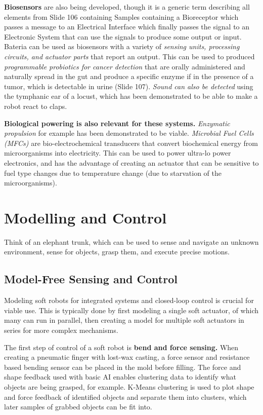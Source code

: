 \documentclass[onecolumn,a4paper]{article}
\begin{document}
\begin{itemize}
    \textbf{Biosensors} are also being developed, though it is a generic term describing all elements from Slide 106 containing Samples containing a Bioreceptor which passes a message to an Electrical Interface which finally passes the signal to an Electronic System that can use the signals to produce some output or input. Bateria can be used as biosensors with a variety of \emph{sensing units, processing circuits, and actuator parts} that report an output. This can be used to produced \emph{programmable probiotics for cancer detection} that are orally administered and naturally spread in the gut and produce a specific enzyme if in the presence of a tumor, which is detectable in urine (Slide 107). \emph{Sound can also be detected} using the tymphanic ear of a locust, which has been demonstrated to be able to make a robot react to claps.
\end{itemize}

\textbf{Biological powering is also relevant for these systems.} \emph{Enzymatic propulsion} for example has been demonstrated to be viable. \emph{Microbial Fuel Cells (MFCs)} are bio-electrochemical transducers that convert biochemical energy from microorganisms into electricity. This can be used to power ultra-lo power electronics, and has the advantage of creating an actuator that can be sensitive to fuel type changes due to temperature change (due to starvation of the microorganisms).

\section{Modelling and Control}

Think of an elephant trunk, which can be used to sense and navigate an unknown environment, sense for objects, grasp them, and execute precise motions.

\subsection{Model-Free Sensing and Control}

Modeling soft robots for integrated systems and closed-loop control is crucial for viable use. This is typically done by first modeling a single soft actuator, of which many can run in parallel, then creating a model for multiple soft actuators in series for more complex mechanisms.

The first step of control of a soft robot is \textbf{bend and force sensing.} When creating a pneumatic finger with lost-wax casting, a force sensor and resistance based bending sensor can be placed in the mold before filling. The force and shape feedback used with basic AI enables clustering data to identify what objects are being grasped, for example. K-Means clustering is used to plot shape and force feedback of identified objects and separate them into clusters, which later samples of grabbed objects can be fit into.
\end{document}
